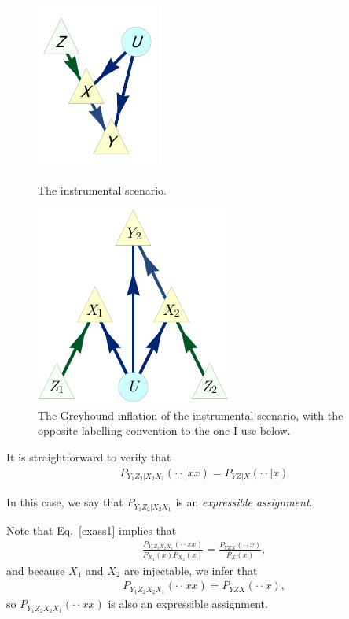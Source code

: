 \documentclass[aps,english,superscriptaddress,onecolumn,twoside,longbibliography,pra,floatfix,fleqn,nofootinbib]{revtex4-1}%
\theoremstyle{definition}
\begin{document}
\begin{figure}[h!]
\centering
\begin{minipage}[t]{0.4\linewidth}
\centering
\includegraphics[scale=1]{InstrumentalDAGpearl.pdf}
\caption{The instrumental scenario.}\label{fig:instrumental}
\end{minipage}
\hfill
\begin{minipage}[htb]{0.5\linewidth}
\centering
\includegraphics[scale=1]{instrumentalvariant.pdf}
\caption{The Greyhound inflation of the instrumental scenario, with the opposite labelling convention to the one I use below.}\label{fig:InflatedInstrumental}
\end{minipage}
\end{figure}

It is straightforward to verify that 
\begin{align}
P_{Y_1 Z_2 |X_2 X_1} ( \cdot \cdot | xx) = P_{Y Z |X} ( \cdot \cdot | x)
\label{exass1}
\end{align}

 In this case, we say that $P_{Y_1 Z_2 |X_2 X_1}$ is an {\em expressible assignment}.
 
 Note that Eq.~\eqref{exass1} implies that 
  \begin{align}
\frac{P_{Y_1 Z_2 X_2 X_1} ( \cdot \cdot xx)}{P_{X_1}(x)P_{X_2}(x)} = \frac{P_{Y Z X} ( \cdot \cdot x)}{P_{X}(x)},
\end{align}
and because $X_1$ and $X_2$ are injectable, we infer that 
 \begin{align}
P_{Y_1 Z_2 X_2 X_1} ( \cdot \cdot xx) = P_{Y Z X} ( \cdot \cdot x),
\end{align}
so $P_{Y_1 Z_2 X_2 X_1} ( \cdot \cdot xx)$ is also an expressible assignment. 
\end{document}
